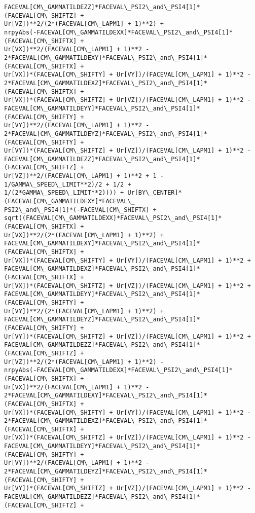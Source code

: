 \documentclass[landscape,letterpaper,10pt,english]{article}
\begin{document}
\begin{Verbatim}[commandchars=\\\{\}]
FACEVAL[CM\_GAMMATILDEZZ]*FACEVAL\_PSI2\_and\_PSI4[1]*(FACEVAL[CM\_SHIFTZ] +
Ur[VZ])**2/(2*(FACEVAL[CM\_LAPM1] + 1)**2) +
nrpyAbs(-FACEVAL[CM\_GAMMATILDEXX]*FACEVAL\_PSI2\_and\_PSI4[1]*(FACEVAL[CM\_SHIFTX] +
Ur[VX])**2/(FACEVAL[CM\_LAPM1] + 1)**2 -
2*FACEVAL[CM\_GAMMATILDEXY]*FACEVAL\_PSI2\_and\_PSI4[1]*(FACEVAL[CM\_SHIFTX] +
Ur[VX])*(FACEVAL[CM\_SHIFTY] + Ur[VY])/(FACEVAL[CM\_LAPM1] + 1)**2 -
2*FACEVAL[CM\_GAMMATILDEXZ]*FACEVAL\_PSI2\_and\_PSI4[1]*(FACEVAL[CM\_SHIFTX] +
Ur[VX])*(FACEVAL[CM\_SHIFTZ] + Ur[VZ])/(FACEVAL[CM\_LAPM1] + 1)**2 -
FACEVAL[CM\_GAMMATILDEYY]*FACEVAL\_PSI2\_and\_PSI4[1]*(FACEVAL[CM\_SHIFTY] +
Ur[VY])**2/(FACEVAL[CM\_LAPM1] + 1)**2 -
2*FACEVAL[CM\_GAMMATILDEYZ]*FACEVAL\_PSI2\_and\_PSI4[1]*(FACEVAL[CM\_SHIFTY] +
Ur[VY])*(FACEVAL[CM\_SHIFTZ] + Ur[VZ])/(FACEVAL[CM\_LAPM1] + 1)**2 -
FACEVAL[CM\_GAMMATILDEZZ]*FACEVAL\_PSI2\_and\_PSI4[1]*(FACEVAL[CM\_SHIFTZ] +
Ur[VZ])**2/(FACEVAL[CM\_LAPM1] + 1)**2 + 1 - 1/GAMMA\_SPEED\_LIMIT**2)/2 + 1/2 +
1/(2*GAMMA\_SPEED\_LIMIT**2)))) + Ur[BY\_CENTER]*(FACEVAL[CM\_GAMMATILDEXY]*FACEVAL\_
PSI2\_and\_PSI4[1]*(-FACEVAL[CM\_SHIFTX] +
sqrt((FACEVAL[CM\_GAMMATILDEXX]*FACEVAL\_PSI2\_and\_PSI4[1]*(FACEVAL[CM\_SHIFTX] +
Ur[VX])**2/(2*(FACEVAL[CM\_LAPM1] + 1)**2) +
FACEVAL[CM\_GAMMATILDEXY]*FACEVAL\_PSI2\_and\_PSI4[1]*(FACEVAL[CM\_SHIFTX] +
Ur[VX])*(FACEVAL[CM\_SHIFTY] + Ur[VY])/(FACEVAL[CM\_LAPM1] + 1)**2 +
FACEVAL[CM\_GAMMATILDEXZ]*FACEVAL\_PSI2\_and\_PSI4[1]*(FACEVAL[CM\_SHIFTX] +
Ur[VX])*(FACEVAL[CM\_SHIFTZ] + Ur[VZ])/(FACEVAL[CM\_LAPM1] + 1)**2 +
FACEVAL[CM\_GAMMATILDEYY]*FACEVAL\_PSI2\_and\_PSI4[1]*(FACEVAL[CM\_SHIFTY] +
Ur[VY])**2/(2*(FACEVAL[CM\_LAPM1] + 1)**2) +
FACEVAL[CM\_GAMMATILDEYZ]*FACEVAL\_PSI2\_and\_PSI4[1]*(FACEVAL[CM\_SHIFTY] +
Ur[VY])*(FACEVAL[CM\_SHIFTZ] + Ur[VZ])/(FACEVAL[CM\_LAPM1] + 1)**2 +
FACEVAL[CM\_GAMMATILDEZZ]*FACEVAL\_PSI2\_and\_PSI4[1]*(FACEVAL[CM\_SHIFTZ] +
Ur[VZ])**2/(2*(FACEVAL[CM\_LAPM1] + 1)**2) -
nrpyAbs(-FACEVAL[CM\_GAMMATILDEXX]*FACEVAL\_PSI2\_and\_PSI4[1]*(FACEVAL[CM\_SHIFTX] +
Ur[VX])**2/(FACEVAL[CM\_LAPM1] + 1)**2 -
2*FACEVAL[CM\_GAMMATILDEXY]*FACEVAL\_PSI2\_and\_PSI4[1]*(FACEVAL[CM\_SHIFTX] +
Ur[VX])*(FACEVAL[CM\_SHIFTY] + Ur[VY])/(FACEVAL[CM\_LAPM1] + 1)**2 -
2*FACEVAL[CM\_GAMMATILDEXZ]*FACEVAL\_PSI2\_and\_PSI4[1]*(FACEVAL[CM\_SHIFTX] +
Ur[VX])*(FACEVAL[CM\_SHIFTZ] + Ur[VZ])/(FACEVAL[CM\_LAPM1] + 1)**2 -
FACEVAL[CM\_GAMMATILDEYY]*FACEVAL\_PSI2\_and\_PSI4[1]*(FACEVAL[CM\_SHIFTY] +
Ur[VY])**2/(FACEVAL[CM\_LAPM1] + 1)**2 -
2*FACEVAL[CM\_GAMMATILDEYZ]*FACEVAL\_PSI2\_and\_PSI4[1]*(FACEVAL[CM\_SHIFTY] +
Ur[VY])*(FACEVAL[CM\_SHIFTZ] + Ur[VZ])/(FACEVAL[CM\_LAPM1] + 1)**2 -
FACEVAL[CM\_GAMMATILDEZZ]*FACEVAL\_PSI2\_and\_PSI4[1]*(FACEVAL[CM\_SHIFTZ] +

\end{Verbatim}
\end{document}
